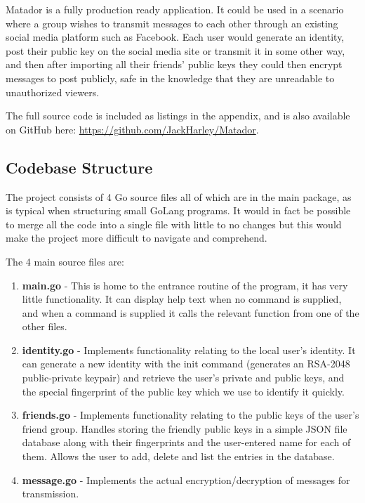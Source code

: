 \documentclass{article}[12pt]
\begin{document}
		Matador is a fully production ready application. It could be used in a scenario where a group wishes to transmit messages to each other through an existing social media platform such as Facebook. Each user would generate an identity, post their public key on the social media site or transmit it in some other way, and then after importing all their friends' public keys they could then encrypt messages to post publicly, safe in the knowledge that they are unreadable to unauthorized viewers.
		
		The full source code is included as listings in the appendix, and is also available on GitHub here: \url{https://github.com/JackHarley/Matador}.
	
	\newpage
	
	\subsection{Codebase Structure}
		The project consists of 4 Go source files all of which are in the main package, as is typical when structuring small GoLang programs. It would in fact be possible to merge all the code into a single file with little to no changes but this would make the project more difficult to navigate and comprehend.
		
		The 4 main source files are:
		
		\begin{enumerate}
			\item \textbf{main.go} - This is home to the entrance routine of the program, it has very little functionality. It can display help text when no command is supplied, and when a command is supplied it calls the relevant function from one of the other files.
			
			\item \textbf{identity.go} - Implements functionality relating to the local user's identity. It can generate a new identity with the init command (generates an RSA-2048 public-private keypair) and retrieve the user's private and public keys, and the special fingerprint of the public key which we use to identify it quickly.
			
			\item \textbf{friends.go} - Implements functionality relating to the public keys of the user's friend group. Handles storing the friendly public keys in a simple JSON file database along with their fingerprints and the user-entered name for each of them. Allows the user to add, delete and list the entries in the database.
			
			\item \textbf{message.go} - Implements the actual encryption/decryption of messages for transmission.
		\end{enumerate}
	
\end{document}
